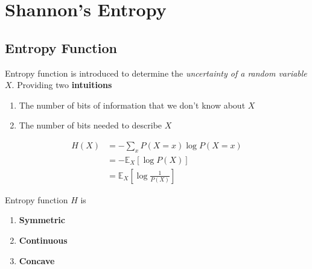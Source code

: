 \chapter{Shannon's Entropy}
\section{Entropy Function}
\begin{definition}
    Entropy function is introduced to determine the \textit{uncertainty of a random variable $X$}. Providing two \textbf{intuitions}
    \begin{enumerate}
        \item The number of bits of information that we don't know about $X$
        \item The number of bits needed to describe $X$
    \end{enumerate}
    \begin{align}
        H(X) &= -\sum_{x} P(X = x) \log{P(X = x)} 
        \\ &= -\mathbb{E}_X \left[ \log{P(X)} \right]
        \\ &= \mathbb{E}_X \left[ \log{\frac{1}{P(X)}} \right]
    \end{align}
\end{definition}
\begin{remark}
Entropy function $H$ is
    \begin{enumerate}
        \item \textbf{Symmetric}
        \item \textbf{Continuous}
        \item \textbf{Concave}
    \end{enumerate}
\end{remark}
